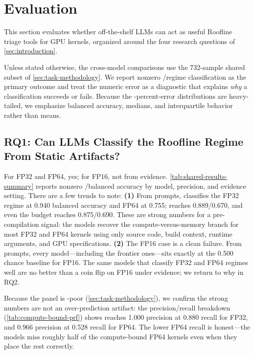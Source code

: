 \section{Evaluation}
\label{sec:results}

This section evaluates whether off-the-shelf LLMs can act as useful Roofline triage tools for GPU kernels, organized around the four research questions of \autoref{sec:introduction}.

Unless stated otherwise, the cross-model comparisons use the 732-sample shared subset of \autoref{sec:task-methodology}.
We report nonzero \bandwidthbound/\computebound regime classification as the primary outcome and treat the numeric \rai error as a diagnostic that explains \textit{why} a classification succeeds or fails.
Because the \rai-percent-error distributions are heavy-tailed, we emphasize balanced accuracy, medians, and interquartile behavior rather than means.








\subsection{RQ1: Can LLMs Classify the Roofline Regime From Static Artifacts?}

For FP32 and FP64, yes; for FP16, not from \sourceonly evidence.
\autoref{tab:shared-results-summary} reports nonzero \bandwidthbound/\computebound balanced accuracy by model, precision, and evidence setting.
There are a few trends to note:
\textbf{(1)} From \sourceonly prompts, \opus classifies the FP32 regime at 0.940 balanced accuracy and FP64 at 0.755; \gptfivefour reaches 0.889/0.670, and even the budget \gptoss reaches 0.875/0.690.
These are strong numbers for a pre-compilation signal: the models recover the compute-versus-memory branch for most FP32 and FP64 kernels using only source code, build context, runtime arguments, and GPU specifications.
\textbf{(2)} The FP16 case is a clean failure.
From \sourceonly prompts, every model---including the frontier ones---sits exactly at the 0.500 chance baseline for FP16.
The same models that classify FP32 and FP64 regimes well are no better than a coin flip on FP16 under \sourceonly evidence; we return to why in RQ2.

Because the panel is \computebound-poor (\autoref{sec:task-methodology}), we confirm the strong numbers are not an over-prediction artifact: the \computebound precision/recall breakdown (\autoref{tab:compute-bound-prf}) shows \sourceonly \opus reaches 1.000 \computebound precision at 0.880 recall for FP32, and 0.966 precision at 0.528 recall for FP64.
The lower FP64 recall is honest---the models miss roughly half of the compute-bound FP64 kernels even when they place the rest correctly.

